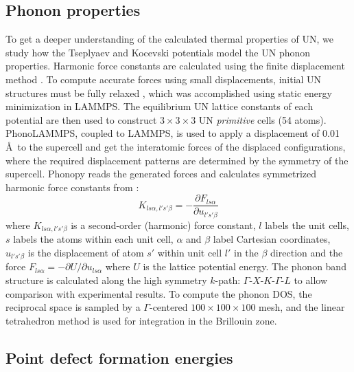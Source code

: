 \documentclass[preprint, 12pt]{elsarticle}
\begin{document}
\subsection{Phonon properties}

To get a deeper understanding of the calculated thermal properties of UN, we study how the Tseplyaev and Kocevski potentials model the UN phonon properties. Harmonic force constants are calculated using the finite displacement method \cite{Giustino2014}. To compute accurate forces using small displacements, initial UN structures must be fully relaxed \cite{Torres2020}, which was accomplished using static energy minimization in LAMMPS. The equilibrium UN lattice constants of each potential are then used to construct $3 \times 3 \times 3$ UN \textit{primitive} cells (54 atoms). PhonoLAMMPS, coupled to LAMMPS, is used to apply a displacement of 0.01 \AA\ to the supercell and get the interatomic forces of the displaced configurations, where the required displacement patterns are determined by the symmetry of the supercell. Phonopy reads the generated forces and calculates symmetrized harmonic force constants from \cite{Kong2011, Togo2015I}:
\begin{equation}
K_{l s \alpha, l' s' \beta} = - \frac{\partial F_{l s \alpha}}{\partial u_{l' s' \beta}}
\label{Eq:PH1}
\end{equation}
where $K_{l s \alpha, l' s' \beta}$ is a second-order (harmonic) force constant, $l$ labels the unit cells, $s$ labels the atoms within each unit cell, $\alpha$ and $\beta$ label Cartesian coordinates, $u_{l' s' \beta}$ is the displacement of atom $s'$ within unit cell $l'$ in the $\beta$ direction and the force $F_{l s \alpha} = - \partial U / \partial u_{l s \alpha}$ where $U$ is the lattice potential energy. The phonon band structure is calculated along the high symmetry $k$-path: $\Gamma$-$X$-$K$-$\Gamma$-$L$ to allow comparison with experimental results. To compute the phonon DOS, the reciprocal space is sampled by a $\Gamma$-centered $100 \times 100 \times 100$ mesh, and the linear tetrahedron method is used for integration in the Brillouin zone.

\subsection{Point defect formation energies}
\label{Sec:FormE}
\end{document}
